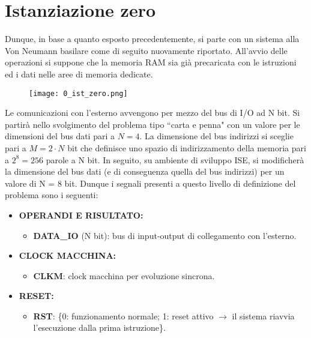 \section*{Istanziazione zero}
Dunque, in base a quanto esposto precedentemente, si parte con un sistema alla Von Neumann basilare come di seguito nuovamente riportato. All'avvio delle operazioni si suppone che la memoria RAM sia già precaricata con le istruzioni ed i dati nelle aree di memoria dedicate.
\begin{figure}[H]
	\centering
	\texttt{[image: 0\_ist\_zero.png]}
	\label{fig:ist_0}
\end{figure}
\noindent
Le comunicazioni con l'esterno avvengono per mezzo del bus di I/O ad N bit. Si partirà nello svolgimento del problema tipo \textquotedblleft carta e penna" con un valore per le dimensioni del bus dati pari a $N = 4$. La dimensione del bus indirizzi si sceglie pari a $M=2\cdot N$ bit che definisce uno spazio di indirizzamento della memoria pari a $2^{8} = 256$ parole a N bit. In seguito, su ambiente di sviluppo ISE, si modificherà la dimensione del bus dati (e di conseguenza quella del bus indirizzi) per un valore di N = 8 bit. Dunque i segnali presenti a questo livello di definizione del problema sono i seguenti:
\begin{itemize}
	\item \textbf{OPERANDI E RISULTATO:}
	\begin{itemize}
		\item \textbf{DATA\_IO} (N bit): bus di input-output di collegamento con l'esterno.
	\end{itemize}

	\item \textbf{CLOCK MACCHINA:}
	\begin{itemize}
		\item \textbf{CLKM}: clock macchina per evoluzione sincrona.
	\end{itemize}

	\item \textbf{RESET:}
	\begin{itemize}
		\item \textbf{RST}: \{0: funzionamento normale; 1: reset attivo $\rightarrow$ il sistema riavvia l'esecuzione dalla prima istruzione\}.
	\end{itemize}
\end{itemize}
